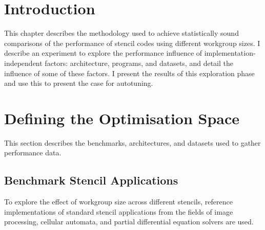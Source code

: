 \section{Introduction}

This chapter describes the methodology used to achieve statistically
sound comparisons of the performance of stencil codes using different
workgroup sizes. I describe an experiment to explore the performance
influence of implementation-independent factors: architecture,
programs, and datasets, and detail the influence of some of these
factors. I present the results of this exploration phase and use this
to present the case for autotuning.


\section{Defining the Optimisation Space}

This section describes the benchmarks, architectures, and datasets
used to gather performance data.


\subsection{Benchmark Stencil Applications}

To explore the effect of workgroup size across different stencils,
reference implementations of standard stencil applications from the
fields of image processing, cellular automata, and partial
differential equation solvers are used.


